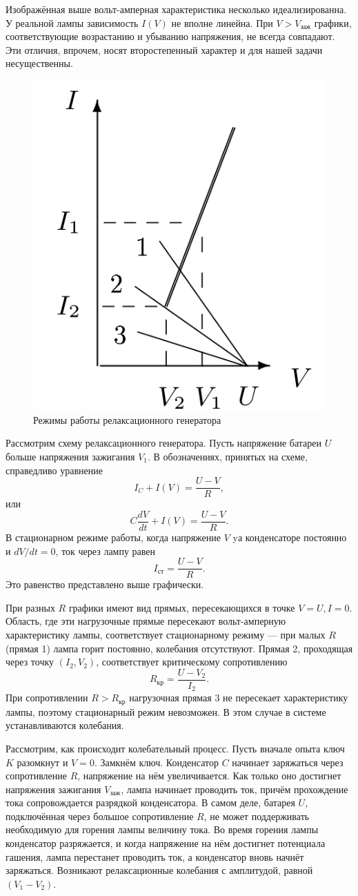\documentclass[a4paper, fontsize=14pt]{article}
\begin{document}
Изображённая выше вольт-амперная характеристика несколько идеализированна. У реальной лампы зависимость $I(V)$ не вполне линейна. При $V > V_\text{заж}$ графики, соответствующие возрастанию и убыванию напряжения, не всегда совпадают. Эти отличия, впрочем, носят второстепенный характер и для нашей задачи несущественны.

\begin{figure}[H]
		\includegraphics[width = 0.3\linewidth]{r.png}
		\caption{Режимы работы релаксационного генератора}
	\end{figure}
	Рассмотрим схему релаксационного генератора. Пусть напряжение батареи $U$ больше напряжения зажигания $V_1$. В обозначениях, принятых на схеме, справедливо уравнение
	\[
		I_C + I(V) = \frac{U - V}{R},
	\]
	или 
	\[
		C \frac{dV}{dt} + I(V) = \frac{U - V}{R}.
	\]
	В стационарном режиме работы, когда напряжение $V$ yа конденсаторе постоянно и $dV / dt = 0$, ток через лампу равен
	\[
		I_\text{ст} = \frac{U - V}{R}.
	\]
Это равенство представлено выше графически.

При разных $R$ графики имеют вид прямых, пересекающихся в точке $V = U, I = 0$. Область, где эти нагрузочные прямые пересекают вольт-амперную характеристику лампы, соответствует стационарному режиму --- при малых $R$ (прямая 1) лампа горит постоянно, колебания отсутствуют. Прямая 2, проходящая через точку $(I_2, V_2)$, соответствует критическому сопротивлению 
\[
	R_\text{кр} = \frac{U - V_2}{I_2}.
\]
При сопротивлении $R > R_\text{кр}$ нагрузочная прямая 3 не пересекает характеристику лампы, поэтому стационарный режим невозможен. В этом случае в системе устанавливаются колебания.

Рассмотрим, как происходит колебательный процесс. Пусть  вначале опыта ключ $K$ разомкнут и $V = 0$. Замкнём ключ. Конденсатор $C$ начинает заряжаться через сопротивление $R$, напряжение на нём увеличивается. Как только оно достигнет напряжения зажигания $V_\text{заж}$, лампа начинает проводить ток, причём прохождение тока сопровождается разрядкой конденсатора. В самом деле, батарея $U$, подключённая через большое сопротивление $R$, не может поддерживать необходимую для горения лампы величину тока. Во время горения лампы конденсатор разряжается, и когда напряжение на нём достигнет потенциала гашения, лампа перестанет проводить ток, а конденсатор вновь начнёт заряжаться. Возникают релаксационные колебания с амплитудой, равной $(V_1 - V_2)$.
\end{document}
